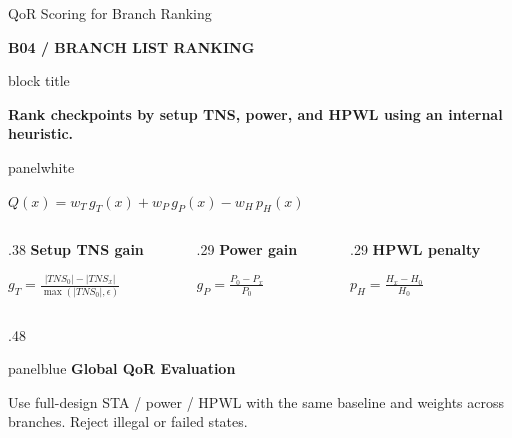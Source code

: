 \documentclass[aspectratio=169,10pt]{beamer}
\newcommand{\smalllabel}[1]{{\scriptsize\bfseries\color{Accent}\MakeUppercase{#1}}}
\newcommand{\takeaway}[1]{%
  \begin{beamercolorbox}[rounded=true,sep=0.15cm,wd=\linewidth]{block title}%
    \strut\textbf{#1}\strut
  \end{beamercolorbox}%
}
\newcommand{\smallpanel}[3]{%
  \begin{beamercolorbox}[rounded=true,sep=0.13cm,wd=\linewidth]{#1}%
    {\small\bfseries\color{Accent}#2}\par\vspace{0.06cm}
    {\scriptsize\color{Ink}#3}%
  \end{beamercolorbox}%
}
\newcommand{\slidenavigation}{}
\newcommand{\slideposition}{}
\newcommand{\slidesubtitle}[1]{%
  \smalllabel{#1}%
}
\begin{document}
\renewcommand{\slidenavigation}{\hyperlink{details-index}{\beamerbutton{Details index}}\hspace{.12cm}\hyperlink{summary-16}{\beamerreturnbutton{Summary 16}}}
\renewcommand{\slideposition}{Backup 4 / 7}
\begin{frame}[shrink=12,label=detail-quality]{QoR Scoring for Branch Ranking}

  \slidesubtitle{B04 / Branch List Ranking}\par\vspace{.12cm}
  \takeaway{Rank checkpoints by setup TNS, power, and HPWL using an internal heuristic.}
  \vspace{.14cm}
  \begin{beamercolorbox}[rounded=true,sep=.14cm,wd=\linewidth]{panelwhite}
    {\centering\Large $\displaystyle Q(x) = w_T\,g_T(x) + w_P\,g_P(x) - w_H\,p_H(x)$\par\vspace{.26cm}}
    \vspace{-.15cm}
    \begin{columns}[T,onlytextwidth]
      \begin{column}{.38\linewidth}\centering
        {\small\bfseries\color{Accent}Setup TNS gain}
        \par\vspace{.12cm}$\displaystyle g_T=\frac{|TNS_0|-|TNS_x|}{\max(|TNS_0|,\epsilon)}$
      \end{column}
      \begin{column}{.29\linewidth}\centering
        {\small\bfseries\color{Accent}Power gain}
        \par\vspace{.12cm}$\displaystyle g_P=\frac{P_0-P_x}{P_0}$
      \end{column}
      \begin{column}{.29\linewidth}\centering
        {\small\bfseries\color{Accent}HPWL penalty}
        \par\vspace{.12cm}$\displaystyle p_H=\frac{H_x-H_0}{H_0}$
      \end{column}
    \end{columns}
  \end{beamercolorbox}
  \vspace{.15cm}
  \begin{columns}[T,onlytextwidth]
    \begin{column}{.48\textwidth}
      \smallpanel{panelblue}{Global QoR Evaluation}{Use full-design STA / power / HPWL with the same baseline and weights across branches. Reject illegal or failed states.}

\end{column}
\end{columns}
\end{frame}
\end{document}
